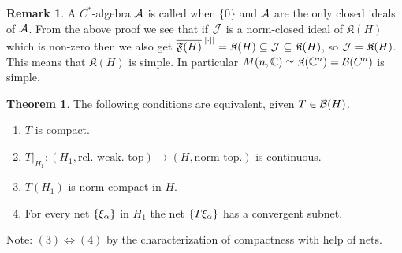 \documentclass[10pt,english,a4paper]{article}
\theoremstyle{definition}
\newtheorem*{theorem}{Theorem}
\newtheorem*{remark}{Remark}
\let\emph\relax %
\def\Ff{\mathfrak{F}}
\def\Kf{\mathfrak{K}}
\begin{document}
\begin{remark}
    A $C^*$-algebra $\mathcal{A}$ is called \emph{simple} when $\{0\}$ and $\mathcal{A}$ are
the only closed ideals of $\mathcal{A}$. From the above proof we see that if $\mathcal{J}$ is a
norm-closed ideal of $\Kf(H)$ which is non-zero then we also get
$\ol{\Ff(H)}^{||\cdot||} = \Kf(H) \subseteq \Js \subseteq \Kf(H)$, so $\Js =
\Kf(H)$.
This means that $\Kf(H)$ is simple. In particular $M(n,\C) \simeq \Kf(\C^n) =
\Bs(C^n)$ is simple.
\end{remark}

\begin{theorem}
    The following conditions are equivalent, given $T \in \mathcal{B}(H)$.
    \begin{enumerate}[(1)]
        \item $T$ is compact.
        \item $T \lvert_{H_1} \colon (H_1, \text{rel. weak. top}) \to (H, \text{norm-top.})$ is 
        continuous.
        \item $T(H_1)$ is norm-compact in $H$. 
        \item For every net $\{\xi_{\alpha}\}$ in $H_1$ the net $\{T\xi_{\alpha}\}$ has 
              a convergent subnet.
    \end{enumerate}
\end{theorem}

Note: $(3) \iff (4)$ by the characterization of compactness with help of nets.
\end{document}
